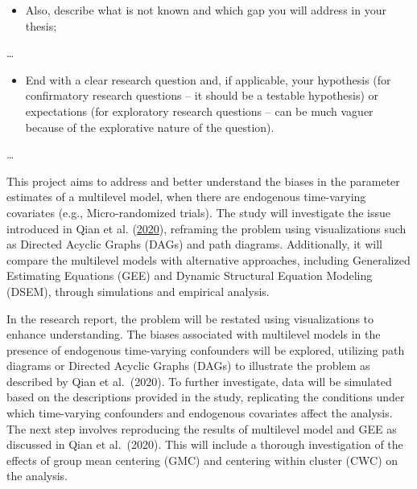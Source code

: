 \documentclass[
  12pt,
  a4paper,
]{article}
\providecommand{\tightlist}{%
  \setlength{\itemsep}{0pt}\setlength{\parskip}{0pt}}\usepackage{longtable,booktabs,array}
\begin{document}
\begin{itemize}
\tightlist
\item
  Also, describe what is not known and which gap you will address in
  your thesis;
\end{itemize}

\ldots{}

\begin{itemize}
\tightlist
\item
  End with a clear research question and, if applicable, your hypothesis
  (for confirmatory research questions -- it should be a testable
  hypothesis) or expectations (for exploratory research questions -- can
  be much vaguer because of the explorative nature of the question).
\end{itemize}

\ldots{}

This project aims to address and better understand the biases in the
parameter estimates of a multilevel model, when there are endogenous
time-varying covariates (e.g., Micro-randomized trials). The study will
investigate the issue introduced in Qian et al.
(\protect\hyperlink{ref-qian2020}{2020}), reframing the problem using
visualizations such as Directed Acyclic Graphs (DAGs) and path diagrams.
Additionally, it will compare the multilevel models with alternative
approaches, including Generalized Estimating Equations (GEE) and Dynamic
Structural Equation Modeling (DSEM), through simulations and empirical
analysis.

In the research report, the problem will be restated using
visualizations to enhance understanding. The biases associated with
multilevel models in the presence of endogenous time-varying confounders
will be explored, utilizing path diagrams or Directed Acyclic Graphs
(DAGs) to illustrate the problem as described by Qian et al.~(2020). To
further investigate, data will be simulated based on the descriptions
provided in the study, replicating the conditions under which
time-varying confounders and endogenous covariates affect the analysis.
The next step involves reproducing the results of multilevel model and
GEE as discussed in Qian et al.~(2020). This will include a thorough
investigation of the effects of group mean centering (GMC) and centering
within cluster (CWC) on the analysis.
\end{document}
